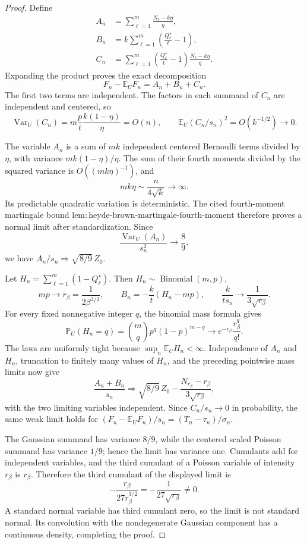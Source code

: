 \documentclass{article}
\begin{document}
\begin{proof}
Define
\[
 \begin{aligned}
 A_n&=\sum_{\ell=1}^m\frac{N_\ell-k\eta}{\eta},\\
 B_n&=k\sum_{\ell=1}^m\left(\frac{Q_\ell^\star}{t}-1\right),\\
 C_n&=\sum_{\ell=1}^m\left(\frac{Q_\ell^\star}{t}-1\right)
              \frac{N_\ell-k\eta}{\eta}.
 \end{aligned}
\]
Expanding the product proves the exact decomposition
\[
 F_n-\mathbb E_UF_n=A_n+B_n+C_n.
\]
The first two terms are independent.  The factors in each summand of \(C_n\) are independent and centered, so
\[
 \operatorname{Var}_U(C_n)
 =m\frac pt\frac{k(1-\eta)}\eta=O(n),\qquad
 \mathbb E_U(C_n/s_n)^2=O(k^{-1/2})\longrightarrow0.
\]

The variable \(A_n\) is a sum of \(mk\) independent centered Bernoulli terms divided by \(\eta\), with variance \(mk(1-\eta)/\eta\).  The sum of their fourth moments divided by the squared variance is \(O((mk\eta)^{-1})\), and
\[
 mk\eta\sim\frac{n}{4\sqrt{k}}\longrightarrow\infty.
\]
Its predictable quadratic variation is deterministic.  The cited fourth-moment martingale bound \(\mathrm{lem:heyde\text{-}brown\text{-}martingale\text{-}fourth\text{-}moment}\) therefore proves a normal limit after standardization.  Since
\[
 \frac{\operatorname{Var}_U(A_n)}{s_n^2}\longrightarrow\frac89,
\]
we have \(A_n/s_n\Rightarrow\sqrt{8/9}\,Z_0\).

Let \(H_n=\sum_{\ell=1}^m(1-Q_\ell^\star)\).  Then \(H_n\sim\operatorname{Binomial}(m,p)\),
\[
 mp\longrightarrow r_\beta=\frac1{2\beta^{3/2}},\qquad
 B_n=-\frac{k}{t}(H_n-mp),\qquad
 \frac{k}{ts_n}\longrightarrow\frac1{3\sqrt{r_\beta}}.
\]
For every fixed nonnegative integer \(q\), the binomial mass formula gives
\[
 \mathbb P_U(H_n=q)=\binom mq p^q(1-p)^{m-q}\longrightarrow
 e^{-r_\beta}\frac{r_\beta^q}{q!}.
\]
The laws are uniformly tight because \(\sup_n\mathbb E_UH_n<\infty\).  Independence of \(A_n\) and \(H_n\), truncation to finitely many values of \(H_n\), and the preceding pointwise mass limits now give
\[
 \frac{A_n+B_n}{s_n}\Rightarrow
 \sqrt{8/9}\,Z_0-\frac{N_{r_\beta}-r_\beta}{3\sqrt{r_\beta}},
\]
with the two limiting variables independent.  Since \(C_n/s_n\to0\) in probability, the same weak limit holds for \((F_n-\mathbb E_UF_n)/s_n=(T_n-\tau_n)/\sigma_n\).

The Gaussian summand has variance \(8/9\), while the centered scaled Poisson summand has variance \(1/9\); hence the limit has variance one.  Cumulants add for independent variables, and the third cumulant of a Poisson variable of intensity \(r_\beta\) is \(r_\beta\).  Therefore the third cumulant of the displayed limit is
\[
 -\frac{r_\beta}{27r_\beta^{3/2}}=-\frac1{27\sqrt{r_\beta}}\ne0.
\]
A standard normal variable has third cumulant zero, so the limit is not standard normal.  Its convolution with the nondegenerate Gaussian component has a continuous density, completing the proof.
\end{proof}
\end{document}
